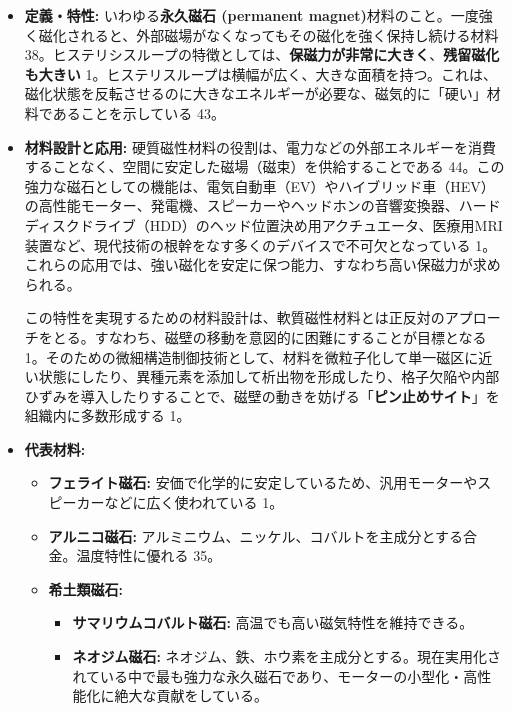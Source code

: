 \documentclass[11pt,a4paper]{ltjsarticle}
\begin{document}
\begin{itemize}
\item \textbf{定義・特性:} いわゆる\textbf{永久磁石 (permanent magnet)}材料のこと。一度強く磁化されると、外部磁場がなくなってもその磁化を強く保持し続ける材料 38。ヒステリシスループの特徴としては、\textbf{保磁力が非常に大きく}、\textbf{残留磁化も大きい} 1。ヒステリスループは横幅が広く、大きな面積を持つ。これは、磁化状態を反転させるのに大きなエネルギーが必要な、磁気的に「硬い」材料であることを示している 43。

\item \textbf{材料設計と応用:} 硬質磁性材料の役割は、電力などの外部エネルギーを消費することなく、空間に安定した磁場（磁束）を供給することである 44。この強力な磁石としての機能は、電気自動車（EV）やハイブリッド車（HEV）の高性能モーター、発電機、スピーカーやヘッドホンの音響変換器、ハードディスクドライブ（HDD）のヘッド位置決め用アクチュエータ、医療用MRI装置など、現代技術の根幹をなす多くのデバイスで不可欠となっている 1。これらの応用では、強い磁化を安定に保つ能力、すなわち高い保磁力が求められる。

この特性を実現するための材料設計は、軟質磁性材料とは正反対のアプローチをとる。すなわち、磁壁の移動を意図的に困難にすることが目標となる 1。そのための微細構造制御技術として、材料を微粒子化して単一磁区に近い状態にしたり、異種元素を添加して析出物を形成したり、格子欠陥や内部ひずみを導入したりすることで、磁壁の動きを妨げる「\textbf{ピン止めサイト}」を組織内に多数形成する 1。

\item \textbf{代表材料:}
\begin{itemize}
\item \textbf{フェライト磁石:} 安価で化学的に安定しているため、汎用モーターやスピーカーなどに広く使われている 1。
\item \textbf{アルニコ磁石:} アルミニウム、ニッケル、コバルトを主成分とする合金。温度特性に優れる 35。
\item \textbf{希土類磁石:}
\begin{itemize}
\item \textbf{サマリウムコバルト磁石:} 高温でも高い磁気特性を維持できる。
\item \textbf{ネオジム磁石:} ネオジム、鉄、ホウ素を主成分とする。現在実用化されている中で最も強力な永久磁石であり、モーターの小型化・高性能化に絶大な貢献をしている。
\end{itemize}
\end{itemize}
\end{itemize}
\end{document}

